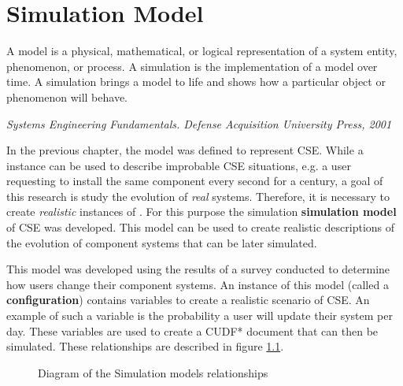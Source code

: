 \chapter{Simulation Model}
\label{simulation}
\epigraph{A model is a physical, mathematical, or logical representation of a system entity, phenomenon, or process. 
A simulation is the implementation of a model over time. 
A simulation brings a model to life and shows how a particular object or phenomenon will behave.}
{\textit{Systems Engineering Fundamentals. Defense Acquisition University Press, 2001}}

In the previous chapter, the \modelname model was defined to represent CSE.
While a \modelname instance can be used to describe improbable CSE situations, 
e.g. a user requesting to install the same component every second for a century,
a goal of this research is study the evolution of \textit{real} systems. 
Therefore, it is necessary to create \textit{realistic} instances of \modelname. 
For this purpose the simulation \textbf{simulation model} of CSE was developed.
This model can be used to create realistic descriptions of the evolution of component systems that can be later simulated.

This model was developed using the results of a survey conducted to determine how users change their component systems.
An instance of this model (called a \textbf{configuration}) contains variables to create a realistic scenario of CSE.
An example of such a variable is the probability a user will update their system per day.
These variables are used to create a CUDF* document that can then be simulated.
These relationships are described in figure \ref{sim.modeldiagram}.

\begin{figure}[htp]
\begin{center}
  \caption{Diagram of the Simulation models relationships}
  \label{sim.modeldiagram}
\end{center}
\end{figure}

